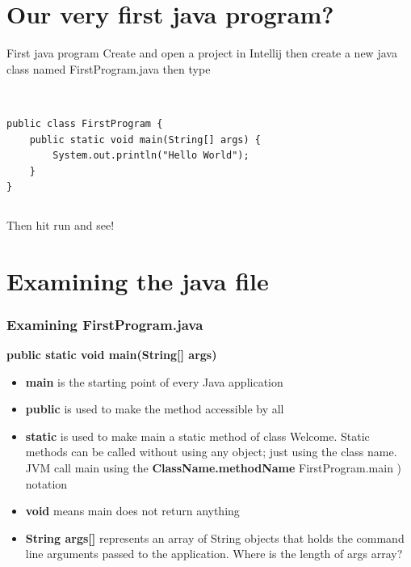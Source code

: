 \documentclass{beamer}
\begin{document}
\section{Our very first java program?}

\begin{frame}[fragile]{First java program}
Create and open a project in Intellij then create a new java class named FirstProgram.java then type\\~\\
\begin{columns}[T]
\begin{column}{\textwidth}
\begin{lstlisting}
public class FirstProgram {
    public static void main(String[] args) {
        System.out.println("Hello World");
    }
}
\end{lstlisting}
\end{column}
\end{columns}
\vspace{0.4in} Then hit run and see!
\end{frame}


\section{Examining the java file}

\begin{frame}
\frametitle{Examining FirstProgram.java}
\textbf{public static void main(String[] args)}
\begin{itemize}
\item \textbf{main} is the starting point of every Java application
\item \textbf{public} is used to make the method accessible by all
\item \textbf{static} is used to make main a static method of class
Welcome. Static methods can be called without using any
object; just using the class name. JVM call main using the
\textbf{ClassName.methodName} FirstProgram.main ) notation
\item \textbf{void} means main does not return anything
\item \textbf{String args[]} represents an array of String objects that
holds the command line arguments passed to the
application. Where is the length of args array?
\end{itemize}
\end{frame}
\end{document}
